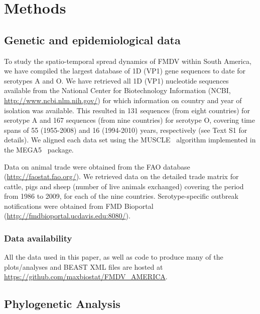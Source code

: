 \documentclass[10pt]{article}
\begin{document}
\section*{Methods}

\subsection*{Genetic and epidemiological data}

To study the spatio-temporal spread dynamics of FMDV within South America, we have compiled the largest database of 1D (VP1) gene sequences to date for serotypes A and O.
We have retrieved all 1D (VP1) nucleotide sequences available from the National Center for Biotechnology Information (NCBI, \url{ http://www.ncbi.nlm.nih.gov/}) for which information on country and year of isolation was available.
This resulted in 131 sequences (from eight countries) for serotype A and 167 sequences (from nine countries) for serotype O, covering time spans of 55 (1955-2008) and 16 (1994-2010) years, respectively (see Text S1 for details).
We aligned each data set using the MUSCLE~\cite{muscle} algorithm implemented in the MEGA5~\cite{MEGA} package.

Data on animal trade were obtained from the FAO database (\url{http://faostat.fao.org/}).
We retrieved data on the detailed trade matrix for cattle, pigs and sheep (number of live animals exchanged) covering the period from 1986 to 2009, for each of the nine countries.
Serotype-specific outbreak notifications were obtained from FMD Bioportal (\url{http://fmdbioportal.ucdavis.edu:8080/}).

\subsubsection*{Data availability}
All the data used in this paper, as well as code to produce many of the plots/analyses and BEAST XML files are hosted at \url{https://github.com/maxbiostat/FMDV_AMERICA}.

\subsection*{Phylogenetic Analysis}
\end{document}
